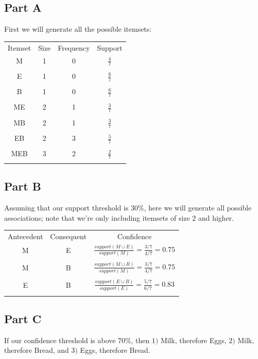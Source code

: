 \documentclass{article}
\begin{document}
\subsection*{Part A}

First we will generate all the possible itemsets:

\begin{center}
    \begin{tabular}{c c c c}
        Itemset & Size & Frequency & Support \\
        M & 1 & 0 & $\frac{4}{7}$\\\\
        E & 1 & 0 & $\frac{6}{7}$\\\\
        B & 1 & 0 & $\frac{6}{7}$\\\\
        ME & 2 & 1 & $\frac{3}{7}$\\\\
        MB & 2 & 1 & $\frac{3}{7}$\\\\
        EB & 2 & 3 & $\frac{5}{7}$\\\\
        MEB & 3 & 2 & $\frac{2}{7}$\\\\
    \end{tabular}
\end{center}

\subsection*{Part B}

Assuming that our support threshold is $30\%$, here we will generate all possible associations; note that we're only including itemsets of size 2 and higher.

\begin{center}
    \begin{tabular}{c c c}
        Antecedent & Consequent & Confidence \\
        M & E & $\frac{support(M \cup E)}{support(M)} = \frac{3/7}{4/7} = 0.75$ \\\\
        M & B & $\frac{support(M \cup B)}{support(M)} = \frac{3/7}{4/7} = 0.75$ \\\\
        E & B & $\frac{support(E \cup B)}{support(E)} = \frac{5/7}{6/7} = 0.83$ \\\\
    \end{tabular}
\end{center}

\subsection*{Part C}

If our confidence threshold is above 70\%, then $1)$ Milk, therefore Eggs, $2)$ Milk, therefore Bread, and $3)$ Eggs, therefore Bread.
\end{document}
